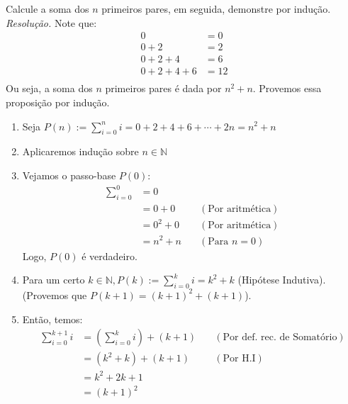 Calcule a soma dos $n$ primeiros pares, em seguida, demonstre por indução. \\
\emph{Resolução.}
Note que:
\begin{align*}
	0 &= 0 \\
	0 + 2 &= 2 \\
	0 + 2 + 4 &= 6 \\
	0 + 2 + 4 + 6 &= 12 \\
\end{align*}
Ou seja, a soma dos $n$ primeiros pares é dada por $n^2 + n$. Provemos essa proposição por indução. \\
\begin{enumerate}
	\item Seja $P(n):= \sum\limits_{i = 0}^{n}i = 0 + 2 + 4 + 6 + \cdots + 2n = n^2 + n$ \\
	\item Aplicaremos indução sobre $n \in \mathbb{N}$ \\
	\item Vejamos o passo-base $P(0)$: 
		\begin{align*}
			\sum\limits_{i = 0}^{0} &= 0  \\	
			&= 0 + 0 &\quad(\text{Por aritmética}) \\
			&= 0^2 + 0 &\quad(\text{Por aritmética}) \\
			&= n^2 + n &\quad(\text{Para $n = 0$})
		\end{align*}
	Logo, $P(0)$ é verdadeiro. \\
	\item Para um certo $k \in \mathbb{N}, P(k):= \sum\limits_{i = 0}^{k}i = k^2 + k$ (Hipótese Indutiva). \\
	(Provemos que $P(k + 1) = (k + 1)^2 + (k + 1)$). \\
	\item Então, temos:
		\begin{align*}
			\sum\limits_{i=0}^{k + 1}i &= (\sum\limits_{i = 0}^{k}i) + (k + 1) &\quad(\text{Por def. rec. de Somatório}) \\
			&= (k^2 + k) + (k + 1) &\quad(\text{Por H.I}) \\
			&= k^2 + 2k + 1 \\
			&= (k + 1)^2
		\end{align*}	
\end{enumerate}
